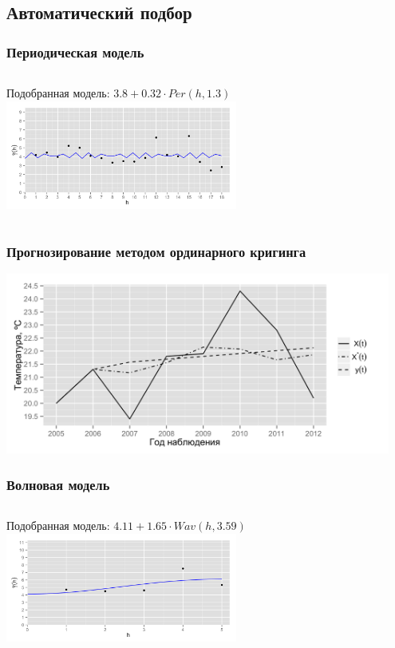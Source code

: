 \documentclass[10pt,pdf,aspectratio=169,hyperref={unicode}]{beamer}
\begin{document}
\subsection{Автоматический подбор}

\begin{frame}
  \frametitle{Периодическая модель}
  \begin{columns}[c]
  \column{2in}
  Подобранная модель: $ 3.8 + 0.32 \cdot Per(h, 1.3) $
  \column{3in}
   \includegraphics[width=3in]{../../figures/variogram/auto-class-18-modeled.png}
  \end{columns}
\end{frame}

\begin{frame}
  \frametitle{Прогнозирование методом ординарного кригинга}
  \includegraphics[width=0.95\textwidth]{../../figures/variogram/auto-class-18-cross-prediction.png}
\end{frame}

\begin{frame}
  \frametitle{Волновая модель}
  \begin{columns}[c]
  \column{2in}
  Подобранная модель: $ 4.11 + 1.65 \cdot Wav(h, 3.59) $
  \column{3in}
   \includegraphics[width=3in]{../../figures/variogram/auto-rob-5-modeled.png}
  \end{columns}
\end{frame}
\end{document}
